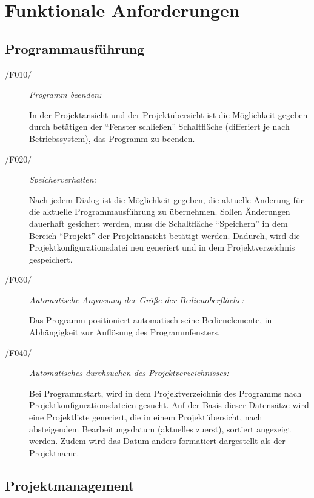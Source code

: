 \section{Funktionale Anforderungen}

\subsection{Programmausführung}

\label{subsec:programmausfuehrung}

	\begin{description}
		
		\item[/F010/] \textit{Programm beenden:}\par In der Projektansicht und der Projektübersicht ist die Möglichkeit gegeben durch betätigen der "`Fenster schließen"' Schaltfläche (differiert je nach Betriebssystem), das Programm zu beenden.
		
		\item[/F020/] \textit{Speicherverhalten:}\par Nach jedem Dialog ist die Möglichkeit gegeben, die aktuelle Änderung für die aktuelle Programmausführung zu übernehmen. Sollen Änderungen dauerhaft gesichert werden, muss die Schaltfläche "`Speichern"' in dem Bereich "`Projekt"' der Projektansicht betätigt werden. Dadurch, wird die Projektkonfigurationsdatei neu generiert und in dem Projektverzeichnis gespeichert.
		
		\item[/F030/] \textit{Automatische Anpassung der Größe der Bedienoberfläche:}\par Das Programm positioniert automatisch seine Bedienelemente, in Abhängigkeit zur Auflösung des Programmfensters.
		
		\item[/F040/] \textit{Automatisches durchsuchen des Projektverzeichnisses:}\par Bei Programmstart, wird in dem Projektverzeichnis des Programms nach Projektkonfigurationsdateien gesucht. Auf der Basis dieser Datensätze wird eine Projektliste generiert, die in einem Projektübersicht, nach absteigendem Bearbeitungsdatum (aktuelles zuerst), sortiert angezeigt werden. Zudem wird das Datum anders formatiert dargestellt als der Projektname.
		
	\end{description}

\subsection{Projektmanagement}

